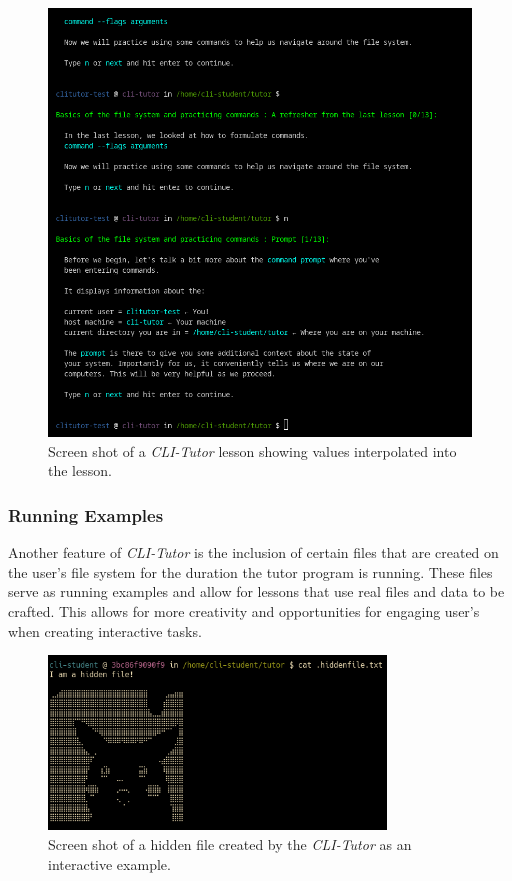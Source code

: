 \begin{figure}[htbp]
	\centering
	\includegraphics[width=1\textwidth]{img/cliexpansionfull}
	\caption{Screen shot of a \textit{CLI-Tutor} lesson showing values interpolated into the lesson.}
	\label{fig:templateexpansion}
\end{figure}

\subsubsection{Running Examples}

Another feature of \textit{CLI-Tutor} is the inclusion of certain files that
are created on the user's file system for the duration the tutor program is
running. These files serve as running examples and allow for lessons that use
real files and data to be crafted. This allows for more creativity and
opportunities for engaging user's when creating interactive tasks.

\begin{figure}[htbp]
	\centering
	\includegraphics[width=0.8\textwidth]{img/hidden}
    \caption{Screen shot of a hidden file created by the \textit{CLI-Tutor} as an interactive example.}
	\label{fig:hidden}
\end{figure}

